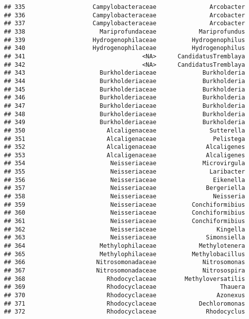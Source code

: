 \documentclass[
]{article}
\begin{document}
\begin{verbatim}
## 335                   Campylobacteraceae               Arcobacter
## 336                   Campylobacteraceae               Arcobacter
## 337                   Campylobacteraceae               Arcobacter
## 338                     Mariprofundaceae            Mariprofundus
## 339                   Hydrogenophilaceae          Hydrogenophilus
## 340                   Hydrogenophilaceae          Hydrogenophilus
## 341                                 <NA>      CandidatusTremblaya
## 342                                 <NA>      CandidatusTremblaya
## 343                     Burkholderiaceae             Burkholderia
## 344                     Burkholderiaceae             Burkholderia
## 345                     Burkholderiaceae             Burkholderia
## 346                     Burkholderiaceae             Burkholderia
## 347                     Burkholderiaceae             Burkholderia
## 348                     Burkholderiaceae             Burkholderia
## 349                     Burkholderiaceae             Burkholderia
## 350                       Alcaligenaceae               Sutterella
## 351                       Alcaligenaceae                Pelistega
## 352                       Alcaligenaceae              Alcaligenes
## 353                       Alcaligenaceae              Alcaligenes
## 354                        Neisseriaceae             Microvirgula
## 355                        Neisseriaceae               Laribacter
## 356                        Neisseriaceae                Eikenella
## 357                        Neisseriaceae              Bergeriella
## 358                        Neisseriaceae                Neisseria
## 359                        Neisseriaceae          Conchiformibius
## 360                        Neisseriaceae          Conchiformibius
## 361                        Neisseriaceae          Conchiformibius
## 362                        Neisseriaceae                 Kingella
## 363                        Neisseriaceae              Simonsiella
## 364                     Methylophilaceae            Methylotenera
## 365                     Methylophilaceae          Methylobacillus
## 366                    Nitrosomonadaceae             Nitrosomonas
## 367                    Nitrosomonadaceae             Nitrosospira
## 368                       Rhodocyclaceae        Methyloversatilis
## 369                       Rhodocyclaceae                  Thauera
## 370                       Rhodocyclaceae                 Azonexus
## 371                       Rhodocyclaceae            Dechloromonas
## 372                       Rhodocyclaceae              Rhodocyclus

\end{verbatim}
\end{document}
